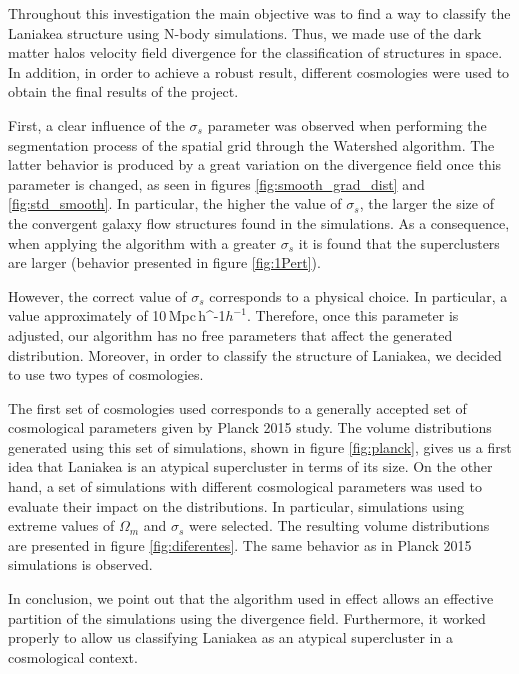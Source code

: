 \documentclass[usenatbib]{mnras}
\newcommand{\Mpch}{\,{\rm Mpc}\,\ifmmode h^{-1}\else $h^{-1}$\fi}
\begin{document}
Throughout this investigation the main objective was to find a way to classify the Laniakea structure using N-body simulations. Thus, we made use of the dark matter halos velocity field divergence for the classification of structures in space. In addition, in order to achieve a robust result, different cosmologies were used to obtain the final results of the project.


First, a clear influence of the $\sigma_s$ parameter was observed when performing the segmentation process of the spatial grid through the Watershed algorithm. The latter behavior is produced by a great variation on the divergence field once this parameter is changed, as seen in figures \ref{fig:smooth_grad_dist} and \ref{fig:std_smooth}. In particular, the higher the value of $\sigma_s$, the larger the size of the convergent galaxy flow structures found in the simulations. As a consequence, when applying the algorithm with a greater $\sigma_s$ it is found that the superclusters are larger (behavior presented in figure \ref{fig:1Pert}).

However, the correct value of $\sigma_s$ corresponds to a physical choice. In particular, a value approximately of 10\Mpch. Therefore, once this parameter is adjusted, our algorithm has no free parameters that affect the generated distribution. Moreover, in order to classify the structure of Laniakea, we decided to use two types of cosmologies. 

The first set of cosmologies used corresponds to a generally accepted set of cosmological parameters given by Planck 2015 study. The volume distributions generated using this set of simulations, shown in figure \ref{fig:planck}, gives us a first idea that Laniakea is an atypical supercluster in terms of its size. On the other hand, a set of simulations with different cosmological parameters was used to evaluate their impact on the distributions. In particular, simulations using extreme values of $\Omega_m$ and $\sigma_s$ were selected. The resulting volume distributions are presented in figure \ref{fig:diferentes}. The same behavior as in Planck 2015 simulations is observed. 

In conclusion, we point out that the algorithm used in effect allows an effective partition of the simulations using the divergence field. Furthermore, it worked properly to allow us classifying Laniakea as an atypical supercluster in a cosmological context.






\end{document}
